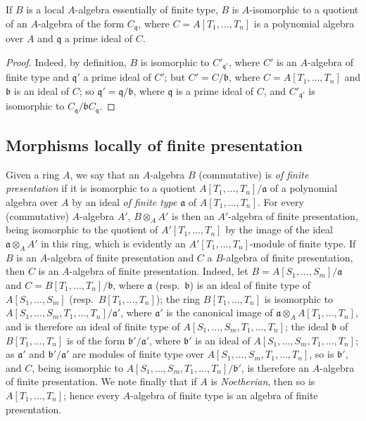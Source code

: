\begin{proposition}[1.3.11]
\label{IV.1.3.11}
If $B$ is a local $A$-algebra essentially of finite type, $B$ is
$A$-isomorphic to a quotient of an $A$-algebra of the form $C_{\mathfrak{q}}$, where
$C=A[T_1,\ldots,T_n]$ is a polynomial algebra over $A$ and $\mathfrak{q}$ a prime ideal of $C$.
\end{proposition}

\begin{proof}
Indeed, by definition, $B$ is isomorphic to $C'_{\mathfrak{q}'}$, where $C'$ is an $A$-algebra of finite type
and $\mathfrak{q}'$ a prime ideal of $C'$; but $C'=C/\mathfrak{b}$, where $C=A[T_1,\ldots,T_n]$ and $\mathfrak{b}$ is an
ideal of $C$; so $\mathfrak{q}'=\mathfrak{q}/\mathfrak{b}$, where $\mathfrak{q}$ is a prime ideal of $C$, and $C'_{\mathfrak{q}'}$ is isomorphic to $C_{\mathfrak{q}}/\mathfrak{b} C_{\mathfrak{q}}$.
\end{proof}

\subsection{Morphisms locally of finite presentation}
\label{subsection:IV.1.4}

\begin{env}[1.4.1]
\label{IV.1.4.1}
Given a ring $A$, we say that an $A$-algebra $B$ (commutative) is \emph{of finite presentation} if it is isomorphic to a quotient $A[T_1,\ldots,T_n]/\mathfrak{a}$ of a polynomial algebra over $A$ by an ideal \emph{of finite type} $\mathfrak{a}$ of $A[T_1,\ldots,T_n]$.
For every (commutative) $A$-algebra $A'$, $B\otimes_A A'$ is then an $A'$-algebra of finite presentation, being isomorphic to the quotient of $A'[T_1,\ldots,T_n]$ by the image of the ideal $\mathfrak{a}\otimes_A A'$ in this ring, which is evidently an $A'[T_1,\ldots,T_n]$-module of finite type.
If $B$ is an $A$-algebra of finite presentation and $C$ a $B$-algebra of finite presentation, then $C$ is an $A$-algebra of finite presentation.
Indeed, let $B = A[S_1,\ldots,S_m]/\mathfrak{a}$ and $C = B[T_1,\ldots,T_n]/\mathfrak{b}$, where $\mathfrak{a}$ (resp.~$\mathfrak{b}$) is an ideal of finite type of $A[S_1,\ldots,S_m]$ (resp.~$B[T_1,\ldots,T_n]$); the ring $B[T_1,\ldots,T_n]$ is isomorphic to $A[S_1,\ldots,S_m,T_1,\ldots,T_n]/\mathfrak{a}'$, where $\mathfrak{a}'$ is the canonical image of $\mathfrak{a}\otimes_A A[T_1,\ldots,T_n]$, and is therefore an ideal of finite type of $A[S_1,\ldots,S_m,T_1,\ldots,T_n]$; the ideal $\mathfrak{b}$ of $B[T_1,\ldots,T_n]$ is of the form $\mathfrak{b}'/\mathfrak{a}'$, where $\mathfrak{b}'$ is an ideal of $A[S_1,\ldots,S_m,T_1,\ldots,T_n]$; as $\mathfrak{a}'$ and $\mathfrak{b}'/\mathfrak{a}'$ are modules of finite type over $A[S_1,\ldots,S_m,T_1,\ldots,T_n]$, so is $\mathfrak{b}'$, and $C$, being isomorphic to $A[S_1,\ldots,S_m,T_1,\ldots,T_n]/\mathfrak{b}'$, is therefore an $A$-algebra of finite presentation.
We note finally that if $A$ is \emph{Noetherian}, then so is $A[T_1,\ldots,T_n]$; hence every $A$-algebra of finite type is an algebra of finite presentation.
\end{env}

